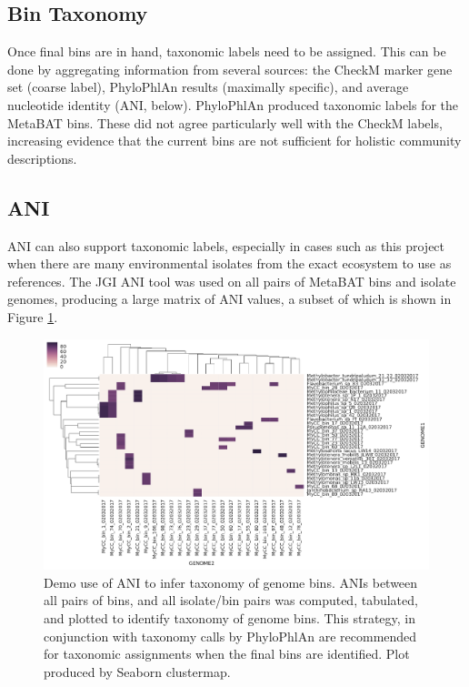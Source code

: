 \subsection{Bin Taxonomy}

Once final bins are in hand, taxonomic labels need to be assigned.
This can be done by aggregating information from several sources: the CheckM marker gene set (coarse label), PhyloPhlAn results (maximally specific), and average nucleotide identity (ANI, below).
PhyloPhlAn produced taxonomic labels for the MetaBAT bins.
These did not agree particularly well with the CheckM labels, increasing evidence that the current bins are not sufficient for holistic community descriptions.

\subsection{ANI}

ANI can also support taxonomic labels, especially in cases such as this project when there are many environmental isolates from the exact ecosystem to use as references.
The JGI ANI tool was used on all pairs of MetaBAT bins and isolate genomes, producing a large matrix of ANI values, a subset of which is shown in Figure \ref{fig:ANIs}.

\begin{figure}[H]
\centering
    \includegraphics[width=1.0\textwidth]{./tex/chapter2/figures/170203_demo_of_ANI_heatmap.pdf}
    \begin{singlespace}
    \caption[Demo use of ANI to infer taxonomy of genome bins]{
        Demo use of ANI to infer taxonomy of genome bins.
        ANIs between all pairs of bins, and all isolate/bin pairs was computed, tabulated, and plotted to identify taxonomy of genome bins.
        This strategy, in conjunction with taxonomy calls by PhyloPhlAn \cite{segata2013} are recommended for taxonomic assignments when the final bins are identified.
        Plot produced by Seaborn clustermap.}
    \label{fig:ANIs}
    \end{singlespace}
\end{figure}

